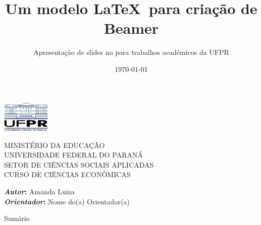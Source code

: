 \documentclass[aspectratio=169]{beamer}
\title[Título]{{\textbf{Um modelo \LaTeX\ para criação de Beamer}}}
\subtitle{\vspace{2pt}Apresentação de slides no para trabalhos acadêmicos da UFPR}
\author[Amanda Luiza]{}
\institute[UFPR]{}
\date{\vspace{-30pt}\today}
\begin{document}
{%
	\begin{frame}[plain]
		
		\begin{center}
		\begin{minipage}{0.16\linewidth}
			\vspace{4pt}
			\flushleft
			\includegraphics[width=2.3cm]{ufprlogo}
		\end{minipage}
		\begin{minipage}{0.45\linewidth}
			\vspace{5pt}
			{\footnotesize{\flushleft MINISTÉRIO DA EDUCAÇÃO\\ 
					UNIVERSIDADE FEDERAL DO PARANÁ\\
					SETOR DE CIÊNCIAS SOCIAIS APLICADAS\\ 
					CURSO DE CIÊNCIAS ECONÔMICAS\\}}
		\end{minipage}
		\end{center}
				
		\begin{center}      
			\vspace{-0.2cm}%
		\end{center}
		
		\titlepage
		
		\begin{center}
        \begin{minipage}[t]{0.6\textwidth}
			\vspace{-2.5cm}
			\centering
			{\textbf{\textit{Autor}:} Amanda Luiza\\
			\textbf{\textit{Orientador}:} Nome do(a) Orientador(a)}
		\end{minipage}
        \end{center}

\end{frame}
}



\begin{frame}{Sumário}
	\hfill
	\parbox[t]{.90\textwidth}{
		\begin{minipage}[c][0.75\textheight]{\textwidth}
			\tableofcontents
		\end{minipage}
	}
\end{frame}



\end{document}
